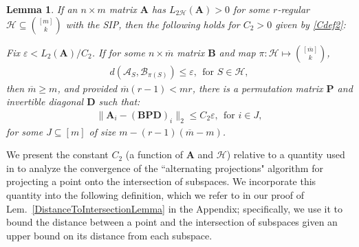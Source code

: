 \documentclass[journal, twocolumn]{IEEEtran}
\newtheorem{lemma}{Lemma}
\begin{document}
\begin{lemma}\label{MainLemma}
If an $n \times m$ matrix $\mathbf{A}$ has $L_{2\mathcal{H}}(\mathbf{A}) > 0$ for some $r$-regular $\mathcal{H} \subseteq {[m] \choose k}$ with the SIP, then the following holds for $C_2 > 0$ given by \eqref{Cdef2}:

Fix $\varepsilon < L_2(\mathbf{A}) / C_2$. If for some $n \times \overline m$ matrix $\mathbf{B}$ and map $\pi: \mathcal{H} \mapsto {[\overline m] \choose k}$,
\begin{align}\label{GapUpperBound}
d(\bm{\mathcal{A}}_S, \bm{\mathcal{B}}_{\pi(S)}) \leq \varepsilon, \ \  \text{for $S \in \mathcal{H}$},
\end{align}
then $\overline m \geq m$, and provided $\overline m (r-1) < mr$, there is a permutation matrix $\mathbf{P}$ and invertible diagonal $\mathbf{D}$ such that:
\begin{align}\label{MainLemmaBPD}
\|\mathbf{A}_i - (\mathbf{B}\mathbf{PD})_i\|_2 \leq C_2 \varepsilon, \ \  \text{for } i \in J,
\end{align}
for some $J \subseteq [m]$ of size \mbox{$m - (r-1)(\overline m - m)$}.
\end{lemma}



We present the constant $C_2$ (a function of $\mathbf{A}$ and $\mathcal{H}$) relative to a quantity used in \cite{Deutsch12} to analyze the convergence of the ``alternating projections" algorithm for projecting a point onto the intersection of subspaces. We incorporate this quantity into the following definition, which we refer to in our proof of Lem.~\ref{DistanceToIntersectionLemma} in the Appendix; specifically, we use it to bound the distance between a point and the intersection of subspaces given an upper bound on its distance from each subspace.
\end{document}
